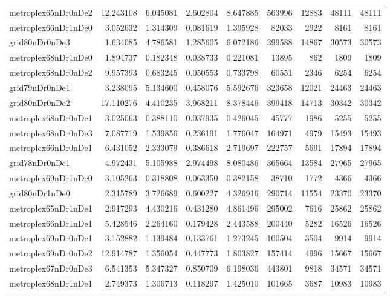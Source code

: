 \begin{longtable}{|l|r|r|r|r|r|r|r|r|}
metroplex65nDr0nDe2 & 12.243108 & 6.045081 & 2.602804 & 8.647885 & 563996 & 12883 & 48111 & 48111 \\
metroplex66nDr1nDe0 & 3.052632 & 1.314309 & 0.081619 & 1.395928 & 82033 & 2922 & 8161 & 8161 \\
grid80nDr0nDe3 & 1.634085 & 4.786581 & 1.285605 & 6.072186 & 399588 & 14867 & 30573 & 30573 \\
metroplex68nDr1nDe0 & 1.894737 & 0.182348 & 0.038733 & 0.221081 & 13895 & 862 & 1809 & 1809 \\
metroplex68nDr0nDe2 & 9.957393 & 0.683245 & 0.050553 & 0.733798 & 60551 & 2346 & 6254 & 6254 \\
grid79nDr0nDe1 & 3.238095 & 5.134600 & 0.458076 & 5.592676 & 323658 & 12021 & 24463 & 24463 \\
grid80nDr0nDe2 & 17.110276 & 4.410235 & 3.968211 & 8.378446 & 399418 & 14713 & 30342 & 30342 \\
metroplex68nDr0nDe1 & 3.025063 & 0.388110 & 0.037935 & 0.426045 & 45777 & 1986 & 5255 & 5255 \\
metroplex68nDr0nDe3 & 7.087719 & 1.539856 & 0.236191 & 1.776047 & 164971 & 4979 & 15493 & 15493 \\
metroplex66nDr0nDe1 & 6.431052 & 2.333079 & 0.386618 & 2.719697 & 222757 & 5691 & 17894 & 17894 \\
grid78nDr0nDe1 & 4.972431 & 5.105988 & 2.974498 & 8.080486 & 365664 & 13584 & 27965 & 27965 \\
metroplex69nDr1nDe0 & 3.105263 & 0.318808 & 0.063350 & 0.382158 & 38710 & 1772 & 4366 & 4366 \\
grid80nDr1nDe0 & 2.315789 & 3.726689 & 0.600227 & 4.326916 & 290714 & 11554 & 23370 & 23370 \\
metroplex65nDr1nDe1 & 2.917293 & 4.430216 & 0.431280 & 4.861496 & 295002 & 7616 & 25862 & 25862 \\
metroplex66nDr1nDe1 & 5.428546 & 2.264160 & 0.179428 & 2.443588 & 200440 & 5282 & 16526 & 16526 \\
metroplex69nDr0nDe1 & 3.152882 & 1.139484 & 0.133761 & 1.273245 & 100504 & 3504 & 9914 & 9914 \\
metroplex69nDr0nDe2 & 12.914787 & 1.356054 & 0.447773 & 1.803827 & 157414 & 4996 & 15667 & 15667 \\
metroplex67nDr0nDe3 & 6.541353 & 5.347327 & 0.850709 & 6.198036 & 443801 & 9818 & 34571 & 34571 \\
metroplex68nDr1nDe1 & 2.749373 & 1.306713 & 0.118297 & 1.425010 & 101665 & 3687 & 10983 & 10983 \\

\end{longtable}
